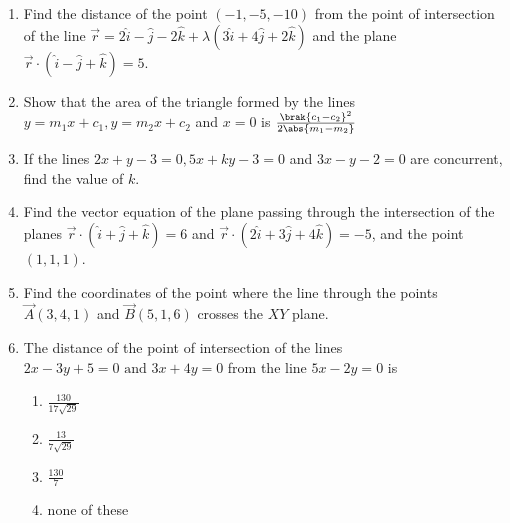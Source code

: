 \begin{enumerate}[label=\thesubsection.\arabic*, ref=\thesubsection.\theenumi]
\item Find the distance of the point $(-1, -5, -10)$ from the point of intersection of the line $\overrightarrow{r}=2\hat{i}-\hat{j}-2\hat{k}+\lambda(3\hat{i}+4\hat{j}+2\hat{k})$ and the plane $\overrightarrow{r}\cdot(\hat{i}-\hat{j}+\hat{k})=5$.
\item Show that the area of the triangle formed by the lines $y=m_1x+c_1,  y=m_2x+c_2$ and $x=0$ is $\frac{\brak{c_1-c_2}^2}{2\abs{m_1-m_2}}$
\item If the lines $2x+y-3=0,  5x+ky-3=0$ and $3x-y-2=0$ are concurrent,  find the value of $k$.
\item Find the vector equation of the plane passing through the intersection of the planes $\overrightarrow{r} \cdot (\hat{i} +\hat{j} +\hat{k})=6$ and $\overrightarrow{r} \cdot (2\hat{i} +3\hat{j} +4\hat{k})=-5$,  and the point $(1,  1,  1)$.
\item Find the coordinates of the point where the line through the points $\vec{A}(3, 4, 1)$ and $\vec{B}(5,  1,  6)$ crosses the $XY$ plane.
\item The distance of the point of intersection of the lines $2x-3y+5=0 \text{ and }3x+4y=0$ from the line $5x-2y=0$ is
\begin{enumerate}
\item $\frac{130}{17\sqrt{29}}$
\item $\frac{13}{7\sqrt{29}}$
\item $\frac{130}{7}$
\item none of these
\end{enumerate}
\end{enumerate}
